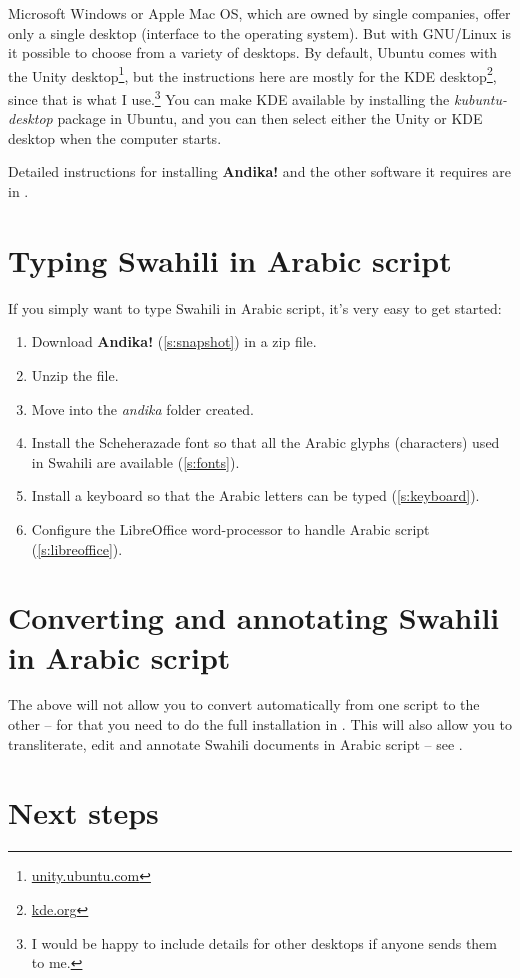 Microsoft Windows or Apple Mac OS, which are owned by single companies, offer only a single desktop (interface to the operating system).  But with GNU/Linux is it possible to choose from a variety of desktops.  By default, Ubuntu comes with the Unity desktop\footnote{\url{unity.ubuntu.com}}, but the instructions here are mostly for the KDE desktop\footnote{\url{kde.org}}, since that is what I use.\footnote{I would be happy to include details for other desktops if anyone sends them to me.}  You can make KDE available by installing the \textit{kubuntu-desktop} package in Ubuntu, and you can then select either  the Unity or KDE desktop when the computer starts.

Detailed instructions for installing \textbf{Andika!} and the other software it requires are in .

\section{Typing Swahili in Arabic script}

If you simply want to type Swahili in Arabic script, it's very easy to get started:
\begin{enumerate}
\item Download \textbf{Andika!} (\ref{s:snapshot}) in a zip file.
\item Unzip the file.
\item Move into the \textit{andika} folder created.
\item Install the Scheherazade font so that all the Arabic glyphs (characters) used in Swahili are available (\ref{s:fonts}).
\item Install a keyboard so that the Arabic letters can be typed (\ref{s:keyboard}).
\item Configure the LibreOffice word-processor to handle Arabic script (\ref{s:libreoffice}).
\end{enumerate}

\section{Converting and annotating Swahili in Arabic script}

The above will not allow you to convert automatically from one script to the other -- for that you need to do the full installation in .  This will also allow you to transliterate, edit and annotate Swahili documents in Arabic script -- see .

\section{Next steps}

